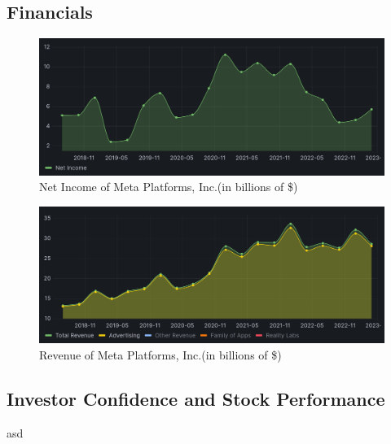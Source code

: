 \documentclass[12pt, a4paper]{article}
\begin{document}
\subsection*{Financials}

\begin{figure}[h]
    \centering
    \includegraphics[width=1.00\textwidth]{net-income}
    \caption{Net Income of Meta Platforms, Inc.(in billions of
    \$)\cite{2023q1,2020q4,2020q3,2020q2,2020q1,2019q4,2019q3,2019q2,2019q1,2018q4,2018q3,2018q2}}
    \label{fig:net-income}
\end{figure}

\begin{figure}[h]
    \centering
    \includegraphics[width=1.00\textwidth]{revenue}
    \caption{Revenue of Meta Platforms, Inc.(in billions of
    \$)\cite{2023q1,2020q4,2020q3,2020q2,2020q1,2019q4,2019q3,2019q2,2019q1,2018q4,2018q3,2018q2}}
    \label{fig:revenue}
\end{figure}


\subsection*{Investor Confidence and Stock Performance}

asd

\end{document}
